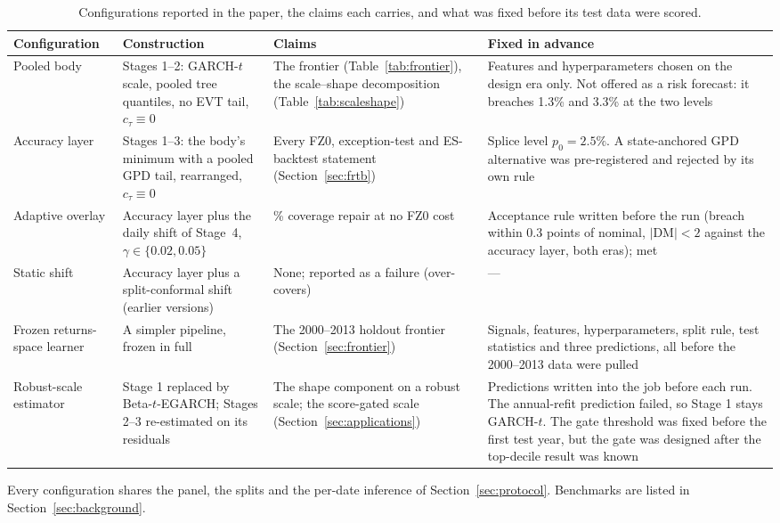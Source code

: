 \documentclass[11pt]{article}
\theoremstyle{remark}
\begin{document}
\begin{table}[t]
\centering
\begin{threeparttable}
\caption{Configurations reported in the paper, the claims each carries, and what was fixed before its test data were scored.}
\label{tab:configs}
\footnotesize\setlength{\tabcolsep}{3pt}
\begin{tabular}{>{\raggedright\arraybackslash}p{}>{\raggedright\arraybackslash}p{}>{\raggedright\arraybackslash}p{}>{\raggedright\arraybackslash}p{}}
\toprule
Configuration & Construction & Claims & Fixed in advance \\
\midrule
Pooled body & Stages 1--2: GARCH-$t$ scale, pooled tree quantiles, no EVT tail, $c_\tau\equiv0$ & The frontier (Table~\ref{tab:frontier}), the scale--shape decomposition (Table~\ref{tab:scaleshape}) & Features and hyperparameters chosen on the design era only. Not offered as a risk forecast: it breaches 1.3\% and 3.3\% at the two levels \\
Accuracy layer & Stages 1--3: the body's minimum with a pooled GPD tail, rearranged, $c_\tau\equiv0$ & Every FZ0, exception-test and ES-backtest statement (Section~\ref{sec:frtb}) & Splice level $p_0=2.5\%$. A state-anchored GPD alternative was pre-registered and rejected by its own rule \\
Adaptive overlay & Accuracy layer plus the daily shift of Stage~4, $\gamma\in\{0.02,0.05\}$ & 97.5\% coverage repair at no FZ0 cost & Acceptance rule written before the run (breach within 0.3 points of nominal, $|\mathrm{DM}|<2$ against the accuracy layer, both eras); met \\
Static shift & Accuracy layer plus a split-conformal shift (earlier versions) & None; reported as a failure (over-covers) & --- \\
Frozen returns-space learner & A simpler pipeline, frozen in full & The 2000--2013 holdout frontier (Section~\ref{sec:frontier}) & Signals, features, hyperparameters, split rule, test statistics and three predictions, all before the 2000--2013 data were pulled \\
Robust-scale estimator & Stage 1 replaced by Beta-$t$-EGARCH; Stages 2--3 re-estimated on its residuals & The shape component on a robust scale; the score-gated scale (Section~\ref{sec:applications}) & Predictions written into the job before each run. The annual-refit prediction failed, so Stage 1 stays GARCH-$t$. The gate threshold was fixed before the first test year, but the gate was designed after the top-decile result was known \\
\bottomrule
\end{tabular}
\begin{tablenotes}\footnotesize
\item Every configuration shares the panel, the splits and the per-date inference of Section~\ref{sec:protocol}. Benchmarks are listed in Section~\ref{sec:background}.
\end{tablenotes}
\end{threeparttable}
\end{table}
\end{document}
